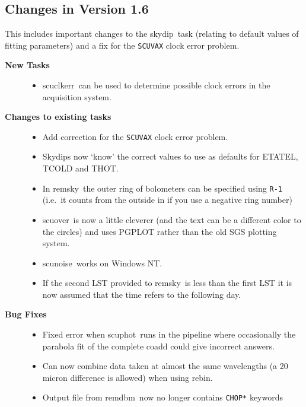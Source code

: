 \documentclass[twoside,11pt]{article}
\newcommand{\task}[1]{{\sf #1}}
\newcommand{\rebin}{\htmlref{\task{rebin}}{REBIN}}
\newcommand{\skydip}{\htmlref{\task{skydip}}{SKYDIP}}
\newcommand{\scuphot}{\htmlref{\task{scuphot}}{SCUPHOT}}
\newcommand{\remsky}{\htmlref{\task{remsky}}{REMSKY}}
\newcommand{\scuover}{\htmlref{\task{scuover}}{SCUOVER}}
\newcommand{\scuclkerr}{\htmlref{\task{scuclkerr}}{SCUCLKERR}}
\newcommand{\remdbm}{\htmlref{\task{remdbm}}{REMDBM}}
\newcommand{\scunoise}{\htmlref{\task{scunoise}}{SCUNOISE}}
\newcommand{\htmlref}[2]{#1}
\renewcommand{\_}{\texttt{\symbol{95}}}
\begin{document}
\subsection{Changes in Version 1.6}

This includes important changes to the \skydip\ task (relating
to default values of fitting parameters) and a fix for the \texttt{SCUVAX}
clock error problem.

\begin{description}

\item[\textbf{New Tasks}] \mbox{}

\begin{itemize}
\item \scuclkerr\ can be used to determine possible clock errors
    in the acquisition system.
\end{itemize}


\item[\textbf{Changes to existing tasks}] \mbox{}

\begin{itemize}
\item Add correction for the \texttt{SCUVAX} clock error problem.

\item Skydips now `know'  the correct values to use as defaults for ETA\_TEL,
T\_COLD and T\_HOT.

\item In \remsky\ the outer ring of bolometers can be specified using \texttt{R-1} (i.e.\ it counts from the outside in if you use a negative ring number)

\item \scuover\ is now a little cleverer (and the text can be a different
    color to the circles) and uses PGPLOT rather than the old SGS plotting
    system.

 \item \scunoise\ works on Windows NT.

 \item If the second LST provided to \remsky\ is less than the first
    LST it is now assumed that the time refers to the following day.

\end{itemize}

\item[\textbf{Bug Fixes}] \mbox{}

\begin{itemize}
\item Fixed error when \scuphot\ runs in the pipeline where occasionally the
    parabola fit of the complete coadd could give incorrect answers.

\item Can now combine data taken at almost the same wavelengths (a 20 micron
    difference is allowed) when using \rebin.

 \item Output file from \remdbm\ now no longer contains \texttt{CHOP\_*}
keywords 

\end{itemize}

\end{description}
\end{document}
